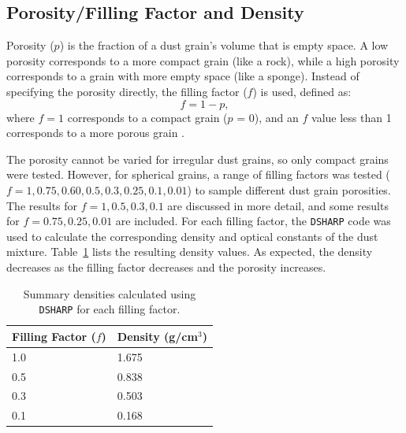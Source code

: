 \subsection{Porosity/Filling Factor and Density}
Porosity ($p$) is the fraction of a dust grain's volume that is empty space. A low porosity corresponds to a more compact grain (like a rock), while a high porosity corresponds to a grain with more empty space (like a sponge). Instead of specifying the porosity directly, the filling factor ($f$) is used, defined as:
\begin{equation}
 f = 1 - p,
    \label{eq: filling factor}
\end{equation}
\noindent where $f=1$ corresponds to a compact grain ($p$ = 0), and an $f$ value less than 1 corresponds to a more porous grain \citep{Zhang2023}. 

The porosity cannot be varied for irregular dust grains, so only compact grains were tested. However, for spherical grains, a range of filling factors was tested ($f = 1, 0.75, 0.60, 0.5, 0.3, 0.25, 0.1, 0.01$) to sample different dust grain porosities. The results for $f = 1, 0.5, 0.3, 0.1$ are discussed in more detail, and some results for $f = 0.75, 0.25, 0.01$ are included. For each filling factor, the \texttt{DSHARP} code was used to calculate the corresponding density and optical constants of the dust mixture. Table~\ref{tab:dsharp_density} lists the resulting density values. As expected, the density decreases as the filling factor decreases and the porosity increases.  




\begin{table}[h!]
\centering
\caption{Summary densities calculated using \texttt{DSHARP} for each filling factor.}
\begin{tabular}{ll}
\toprule
\textbf{Filling Factor (\boldmath$f$)} &
\textbf{Density (g/cm\boldmath$^3$)} \\
\midrule
1.0    & 1.675 \\
0.5 & 0.838 \\
0.3  & 0.503 \\
0.1 & 0.168 \\
\bottomrule
\end{tabular}
\label{tab:dsharp_density}
\end{table}



